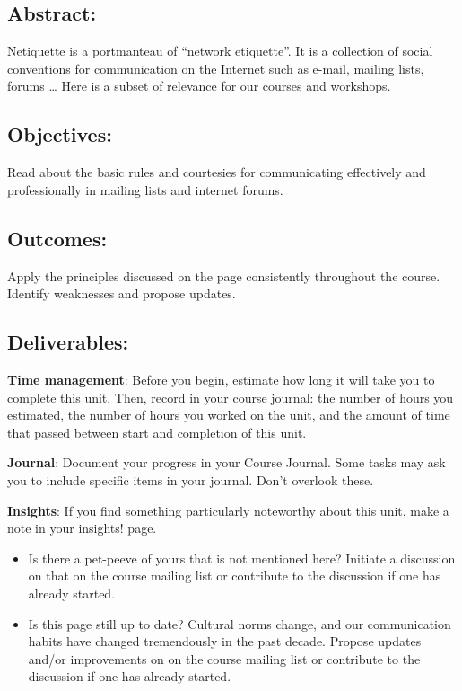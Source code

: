 \documentclass[]{book}
\providecommand{\tightlist}{%
  \setlength{\itemsep}{0pt}\setlength{\parskip}{0pt}}
\begin{document}
\subsection{Abstract:}\label{abstract-6}

Netiquette is a portmanteau of ``network etiquette''. It is a collection
of social conventions for communication on the Internet such as e-mail,
mailing lists, forums \ldots{} Here is a subset of relevance for our
courses and workshops.

\subsection{Objectives:}\label{objectives-6}

Read about the basic rules and courtesies for communicating effectively
and professionally in mailing lists and internet forums.

\subsection{Outcomes:}\label{outcomes-6}

Apply the principles discussed on the page consistently throughout the
course. Identify weaknesses and propose updates.

\subsection{Deliverables:}\label{deliverables-6}

\textbf{Time management}: Before you begin, estimate how long it will
take you to complete this unit. Then, record in your course journal: the
number of hours you estimated, the number of hours you worked on the
unit, and the amount of time that passed between start and completion of
this unit.

\textbf{Journal}: Document your progress in your Course Journal. Some
tasks may ask you to include specific items in your journal. Don't
overlook these.

\textbf{Insights}: If you find something particularly noteworthy about
this unit, make a note in your insights! page.

\begin{itemize}
\tightlist
\item
  Is there a pet-peeve of yours that is not mentioned here? Initiate a
  discussion on that on the course mailing list or contribute to the
  discussion if one has already started.
\item
  Is this page still up to date? Cultural norms change, and our
  communication habits have changed tremendously in the past decade.
  Propose updates and/or improvements on on the course mailing list or
  contribute to the discussion if one has already started.
\end{itemize}
\end{document}
